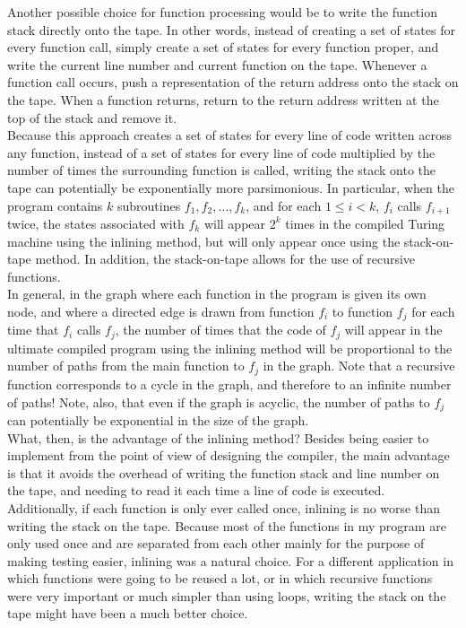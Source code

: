 \documentclass[11pt]{report}
\begin{document}
Another possible choice for function processing would be to write the function stack directly onto the tape. In other words, instead of creating a set of states for every function call, simply create a set of states for every function proper, and write the current line number and current function on the tape. Whenever a function call occurs, push a representation of the return address onto the stack on the tape. When a function returns, return to the return address written at the top of the stack and remove it. \\

Because this approach creates a set of states for every line of code written across any function, instead of a set of states for every line of code multiplied by the number of times the surrounding function is called, writing the stack onto the tape can potentially be exponentially more parsimonious. In particular, when the program contains $k$ subroutines $f_1, f_2, \dots, f_k$, and for each $1 \le i < k$, $f_i$ calls $f_{i+1}$ twice, the states associated with $f_k$ will appear $2^k$ times in the compiled Turing machine using the inlining method, but will only appear once using the stack-on-tape method. In addition, the stack-on-tape allows for the use of recursive functions.\\

In general, in the graph where each function in the program is given its own node, and where a directed edge is drawn from function $f_i$ to function $f_j$ for each time that $f_i$ calls $f_j$, the number of times that the code of $f_j$ will appear in the ultimate compiled program using the inlining method will be proportional to the number of paths from the main function to $f_j$ in the graph. Note that a recursive function corresponds to a cycle in the graph, and therefore to an infinite number of paths! Note, also, that even if the graph is acyclic, the number of paths to $f_j$ can potentially be exponential in the size of the graph. \\

What, then, is the advantage of the inlining method? Besides being easier to implement from the point of view of designing the compiler, the main advantage is that it avoids the overhead of writing the function stack and line number on the tape, and needing to read it each time a line of code is executed. Additionally, if each function is only ever called once, inlining is no worse than writing the stack on the tape. Because most of the functions in my program are only used once and are separated from each other mainly for the purpose of making testing easier, inlining was a natural choice. For a different application in which functions were going to be reused a lot, or in which recursive functions were very important or much simpler than using loops, writing the stack on the tape might have been a much better choice. \\
\end{document}
